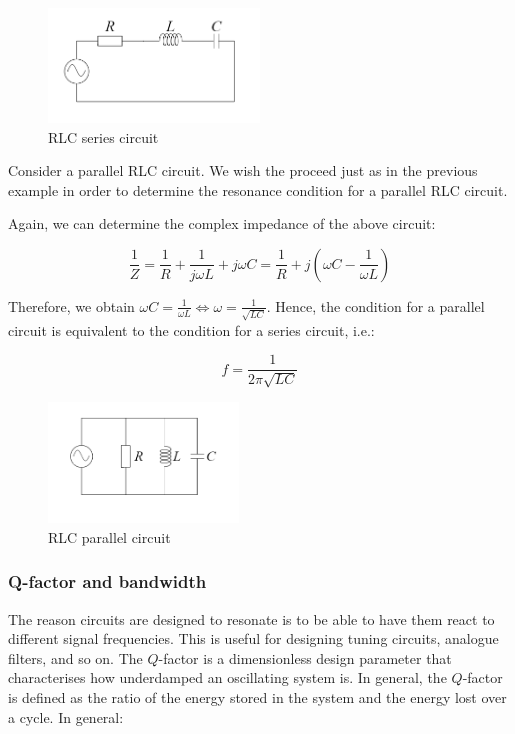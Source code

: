 \documentclass{article}
\begin{document}
\begin{figure}[h]
    \centering
    \includegraphics[width=0.5\textwidth]{images/rlc.png}
    \caption{RLC series circuit}
    \label{fig:rlc-series}
\end{figure}

\begin{proposition}
    Consider a parallel RLC circuit. We wish the proceed just as in the previous example in order to determine the resonance condition for a parallel RLC circuit.

    Again, we can determine the complex impedance of the above circuit:

    \[ \frac{1}{Z} = \frac{1}{R} + \frac{1}{j\omega L} + j\omega C = \frac{1}{R} + j(\omega C - \frac{1}{\omega L}) \]

    Therefore, we obtain $\omega C = \frac{1}{\omega L} \iff \omega = \frac{1}{\sqrt{LC}}$. Hence, the condition for a parallel circuit is equivalent to the condition for a series circuit, i.e.:

    \[ f = \frac{1}{2\pi\sqrt{LC}} \]
\end{proposition}

\begin{figure}[h]
    \centering
    \includegraphics[width=0.45\textwidth]{images/rlcpar.png}
    \caption{RLC parallel circuit}
    \label{fig:rlc-parallel}
\end{figure}

\subsubsection{Q-factor and bandwidth}

The reason circuits are designed to resonate is to be able to have them react to different signal frequencies. This is useful for designing tuning circuits, analogue filters, and so on. The $Q$-factor is a dimensionless design parameter that characterises how underdamped an oscillating system is. In general, the $Q$-factor is defined as the ratio of the energy stored in the system and the energy lost over a cycle. In general:
\end{document}
